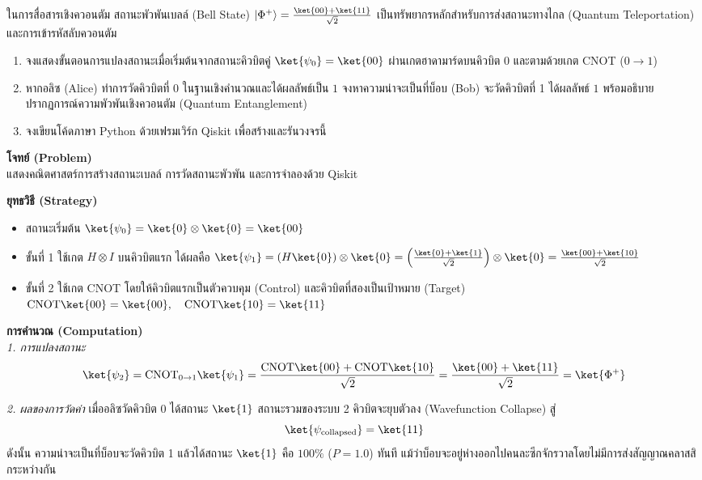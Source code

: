 \begin{psctexample}
ในการสื่อสารเชิงควอนตัม สถานะพัวพันเบลล์ (Bell State) $|\Phi^+\rangle = \frac{\ket{00} + \ket{11}}{\sqrt{2}}$ เป็นทรัพยากรหลักสำหรับการส่งสถานะทางไกล (Quantum Teleportation) และการเข้ารหัสลับควอนตัม
\begin{enumerate}
    \item จงแสดงขั้นตอนการแปลงสถานะเมื่อเริ่มต้นจากสถานะคิวบิตคู่ $\ket{\psi_0} = \ket{00}$ ผ่านเกตฮาดามาร์ดบนคิวบิต 0 และตามด้วยเกต CNOT ($0 \to 1$)
    \item หากอลิซ (Alice) ทำการวัดคิวบิตที่ 0 ในฐานเชิงคำนวณและได้ผลลัพธ์เป็น $1$ จงหาความน่าจะเป็นที่บ็อบ (Bob) จะวัดคิวบิตที่ 1 ได้ผลลัพธ์ $1$ พร้อมอธิบายปรากฏการณ์ความพัวพันเชิงควอนตัม (Quantum Entanglement)
    \item จงเขียนโค้ดภาษา Python ด้วยเฟรมเวิร์ก Qiskit เพื่อสร้างและรันวงจรนี้
\end{enumerate}

\textbf{โจทย์ (Problem)} \\
แสดงคณิตศาสตร์การสร้างสถานะเบลล์ การวัดสถานะพัวพัน และการจำลองด้วย Qiskit

\textbf{ยุทธวิธี (Strategy)} \\
\begin{itemize}
    \item สถานะเริ่มต้น $\ket{\psi_0} = \ket{0} \otimes \ket{0} = \ket{00}$
    \item ขั้นที่ 1 ใช้เกต $H \otimes I$ บนคิวบิตแรก ได้ผลคือ $\ket{\psi_1} = (H\ket{0}) \otimes \ket{0} = \left(\frac{\ket{0} + \ket{1}}{\sqrt{2}}\right) \otimes \ket{0} = \frac{\ket{00} + \ket{10}}{\sqrt{2}}$
    \item ขั้นที่ 2 ใช้เกต CNOT โดยให้คิวบิตแรกเป็นตัวควบคุม (Control) และคิวบิตที่สองเป็นเป้าหมาย (Target)
    $\text{CNOT}\ket{00} = \ket{00}, \quad \text{CNOT}\ket{10} = \ket{11}$
\end{itemize}

\textbf{การคำนวณ (Computation)} \\
\textit{1. การแปลงสถานะ}
\begin{equation}
\ket{\psi_2} = \text{CNOT}_{0\to 1} \ket{\psi_1} = \frac{\text{CNOT}\ket{00} + \text{CNOT}\ket{10}}{\sqrt{2}} = \frac{\ket{00} + \ket{11}}{\sqrt{2}} = \ket{\Phi^+}
\end{equation}

\textit{2. ผลของการวัดค่า}
เมื่ออลิซวัดคิวบิต 0 ได้สถานะ $\ket{1}$ สถานะรวมของระบบ 2 คิวบิตจะยุบตัวลง (Wavefunction Collapse) สู่
\begin{equation}
\ket{\psi_{\text{collapsed}}} = \ket{11}
\end{equation}
ดังนั้น ความน่าจะเป็นที่บ็อบจะวัดคิวบิต 1 แล้วได้สถานะ $\ket{1}$ คือ $100\%$ ($P=1.0$) ทันที แม้ว่าบ็อบจะอยู่ห่างออกไปคนละซีกจักรวาลโดยไม่มีการส่งสัญญาณคลาสสิกระหว่างกัน


\end{psctexample}
